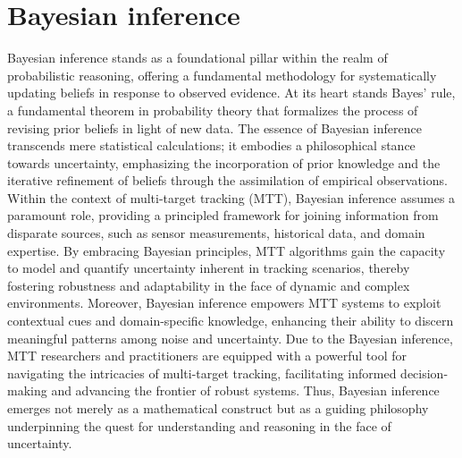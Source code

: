     \section{Bayesian inference}
Bayesian inference stands as a foundational pillar within the realm of probabilistic reasoning, offering a fundamental methodology for systematically updating beliefs in response to observed evidence. At its heart stands Bayes' rule, a fundamental theorem in probability theory that formalizes the process of revising prior beliefs in light of new data. The essence of Bayesian inference transcends mere statistical calculations; it embodies a philosophical stance towards uncertainty, emphasizing the incorporation of prior knowledge and the iterative refinement of beliefs through the assimilation of empirical observations. Within the context of multi-target tracking (MTT), Bayesian inference assumes a paramount role, providing a principled framework for joining information from disparate sources, such as sensor measurements, historical data, and domain expertise. By embracing Bayesian principles, MTT algorithms gain the capacity to model and quantify uncertainty inherent in tracking scenarios, thereby fostering robustness and adaptability in the face of dynamic and complex environments. Moreover, Bayesian inference empowers MTT systems to exploit contextual cues and domain-specific knowledge, enhancing their ability to discern meaningful patterns among noise and uncertainty. Due to the Bayesian inference, MTT researchers and practitioners are equipped with a powerful tool for navigating the intricacies of multi-target tracking, facilitating informed decision-making and advancing the frontier of robust systems. Thus, Bayesian inference emerges not merely as a mathematical construct but as a guiding philosophy underpinning the quest for understanding and reasoning in the face of uncertainty.
